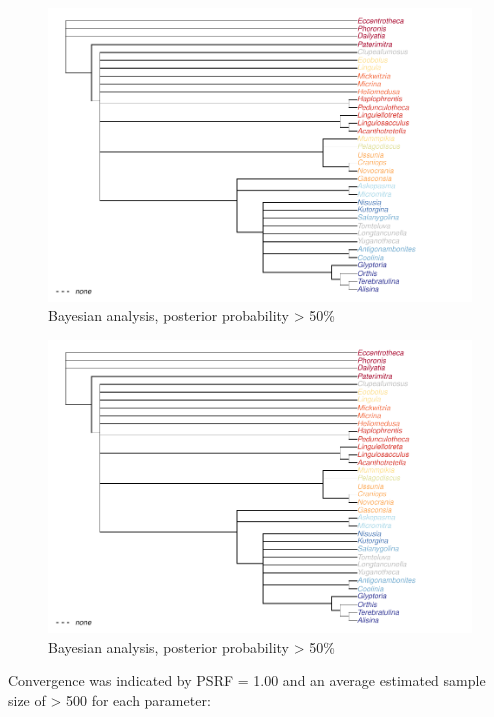 \documentclass[]{book}
\theoremstyle{definition}
\theoremstyle{definition}
\theoremstyle{definition}
\theoremstyle{remark}
\begin{document}
\begin{figure}
\centering
\includegraphics{Brachiopod_phylogeny_files/figure-latex/unnamed-chunk-14-1.pdf}
\caption{\label{fig:unnamed-chunk-14}Bayesian analysis, posterior
probability \textgreater{} 50\%}
\end{figure}

\begin{figure}
\centering
\includegraphics{Brachiopod_phylogeny_files/figure-latex/unnamed-chunk-15-1.pdf}
\caption{\label{fig:unnamed-chunk-15}Bayesian analysis, posterior
probability \textgreater{} 50\%}
\end{figure}

Convergence was indicated by PSRF = 1.00 and an average estimated sample
size of \textgreater{} 500 for each parameter:
\end{document}
